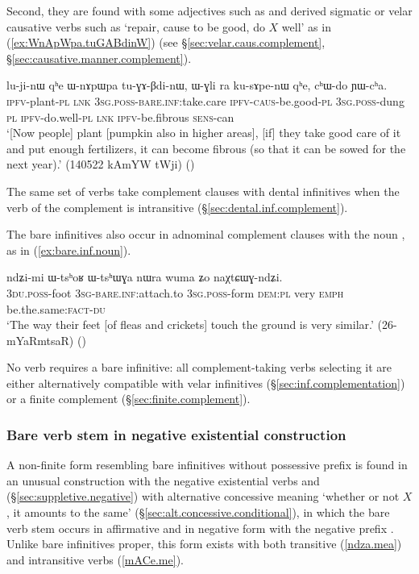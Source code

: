 Second, they are found with some adjectives such as  and derived sigmatic or velar causative verbs such as  `repair, cause to be good, do $X$ well' as in (\ref{ex:WnApWpa.tuGABdinW}) (see §\ref{sec:velar.caus.complement}, §\ref{sec:causative.manner.complement}).

\begin{exe} 
\ex \label{ex:WnApWpa.tuGABdinW}
\gll lu-ji-nɯ qʰe ɯ-nɤpɯpa tu-ɣɤ-βdi-nɯ, ɯ-ɣli ra ku-sɤpe-nɯ qʰe, cʰɯ-do ɲɯ-cʰa. \\
\textsc{ipfv}-plant-\textsc{pl} \textsc{lnk} \textsc{3sg}.\textsc{poss}-\textsc{bare}.\textsc{inf}:take.care \textsc{ipfv}-\textsc{caus}-be.good-\textsc{pl} \textsc{3sg}.\textsc{poss}-dung \textsc{pl} \textsc{ipfv}-do.well-\textsc{pl} \textsc{lnk} \textsc{ipfv}-be.fibrous \textsc{sens}-can \\
\glt `[Now people] plant [pumpkin also in higher areas], [if] they take good care of it and put enough fertilizers, it can become fibrous (so that it can be sowed for the next year).' (140522 kAmYW tWji)
()
\end{exe} 

The same set of verbs take complement clauses with dental infinitives when the verb of the complement is intransitive (§\ref{sec:dental.inf.complement}).

The bare infinitives also occur in adnominal complement clauses with the noun , as in (\ref{ex:bare.inf.noun}).

\begin{exe}
\ex \label{ex:bare.inf.noun}
\gll ndʑi-mi ɯ-tsʰoʁ ɯ-tsʰɯɣa nɯra wuma ʑo naχtɕɯɣ-ndʑi.   \\
\textsc{3du}.\textsc{poss}-foot \textsc{3sg}-\textsc{bare}.\textsc{inf:}attach.to \textsc{3sg}.\textsc{poss}-form \textsc{dem}:\textsc{pl} very \textsc{emph} be.the.same:\textsc{fact}-\textsc{du}  \\
\glt `The way their feet [of fleas and crickets] touch the ground is very similar.' (26-mYaRmtsaR)
()
\end{exe}

No verb requires a bare infinitive: all complement-taking verbs selecting it are either alternatively compatible with velar infinitives (§\ref{sec:inf.complementation}) or a finite complement (§\ref{sec:finite.complement}).

\subsubsection{Bare verb stem in negative existential construction} \label{sec:bare.inf.negative} 
A non-finite form resembling bare infinitives without possessive prefix is found in an unusual construction with the negative existential verbs   and (§\ref{sec:suppletive.negative}) with alternative concessive meaning `whether or not $X$, it amounts to the same' (§\ref{sec:alt.concessive.conditional}), in which the bare verb stem occurs in affirmative and in negative form with the negative prefix . Unlike bare infinitives proper, this form exists with both transitive (\ref{ndza.mea}) and intransitive verbs (\ref{mACe.me}).

